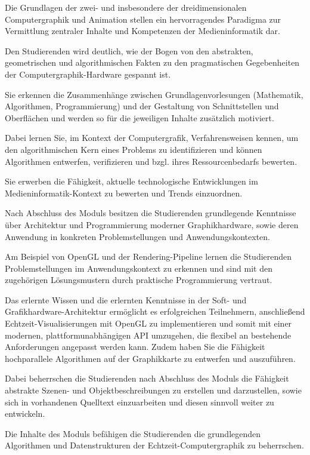 Die Grundlagen der zwei- und insbesondere der dreidimensionalen
Computergraphik und Animation stellen ein hervorragendes Paradigma zur
Vermittlung zentraler Inhalte und Kompetenzen der Medieninformatik dar.

Den Studierenden wird deutlich, wie der Bogen von den abstrakten,
geometrischen und algorithmischen Fakten zu den pragmatischen
Gegebenheiten der Computergraphik-Hardware gespannt ist.

Sie erkennen die Zusammenhänge zwischen Grundlagenvorlesungen
(Mathematik, Algorithmen, Programmierung) und der Gestaltung von
Schnittstellen und Oberflächen und werden so für die jeweiligen Inhalte
zusätzlich motiviert.

Dabei lernen Sie, im Kontext der Computergrafik, Verfahrensweisen
kennen, um den algorithmischen Kern eines Problems zu identifizieren und
können Algorithmen entwerfen, verifizieren und bzgl. ihres
Ressourcenbedarfs bewerten.

Sie erwerben die Fähigkeit, aktuelle technologische Entwicklungen im
Medieninformatik-Kontext zu bewerten und Trends einzuordnen.

Nach Abschluss des Moduls besitzen die Studierenden grundlegende
Kenntnisse über Architektur und Programmierung moderner Graphikhardware,
sowie deren Anwendung in konkreten Problemstellungen und
Anwendungskontexten.

Am Beispiel von OpenGL und der Rendering-Pipeline lernen die
Studierenden Problemstellungen im Anwendungskontext zu erkennen und sind
mit den zugehörigen Lösungsmustern durch praktische Programmierung
vertraut.

Das erlernte Wissen und die erlernten Kenntnisse in der Soft- und
Grafikhardware-Architektur ermöglicht es erfolgreichen Teilnehmern,
anschließend Echtzeit-Visualisierungen mit OpenGL zu implementieren und
somit mit einer modernen, plattformunabhängigen API umzugehen, die
flexibel an bestehende Anforderungen angepasst werden kann. Zudem haben
Sie die Fähigkeit hochparallele Algorithmen auf der Graphikkarte zu
entwerfen und auszuführen.

Dabei beherrschen die Studierenden nach Abschluss des Moduls die
Fähigkeit abstrakte Szenen- und Objektbeschreibungen zu erstellen und
darzustellen, sowie sich in vorhandenen Quelltext einzuarbeiten und
diesen sinnvoll weiter zu entwickeln.

Die Inhalte des Moduls befähigen die Studierenden die grundlegenden
Algorithmen und Datenstrukturen der Echtzeit-Computergraphik zu
beherrschen.

